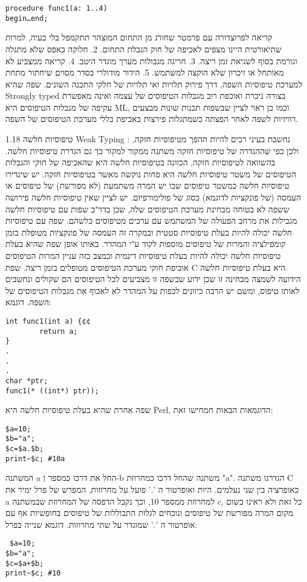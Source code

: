 \begin{טבלא}[!htbp]
\begin{verbatim}
procedure func1(a: 1..4)
begin…end;
\end{verbatim}

      קריאה לפרוצדורה עם פרמטר שחורג מן התחום המוצהר תתקמפל בלי בעיה, למרות שתיאורטית היינו מצפים לאכיפה של חוק הגבלת התחום.
      2. חלוקה באפס שלא מתגלה וגורמת בסוף לשגיאת זמן ריצה.
      3. חריגה מגבולות מערך מוגדר היטב.
      4. קריאה ממצביע לא מאותחל או זיכרון שלא הוקצה למשתמש.
      5. הידור מודולרי בסדר מסוים שיחתור מתחת למערכת טיפוסיות השפה, דרך פירוק תלויות ואי תלויות של חלקי התכנה השונים.
      שפה שהיא Strongly typed בצורה ניכרת ואוכפת רוב מגבלות הטיפוסים של עצמה ואינה מאפשרת עקיפה של מגבלות הטיפוסים היא ML, וכמו כן ראוי לציין שבשפות תכנות שונות מבצעים רוויזיות לשפה לאחר הפצתה כשמתגלות פירצות באכיפת כללי מערכת הטיפוסים של השפה.

      1.18 טיפוסיות חלשה Weak Typing :
      נחשבת בעיני רבים להיות ההפך מטיפוסיות חזקה, ולכן כפי שההגדרה של טיפוסיות חזקה משתנה ממקור למקור כך גם הגדרת טיפוסיות חלשה.
      בהשוואה לטיפוסיות חזקה, הכוונה בטיפוסיות חלשה היא שהאכיפה של חוקי והגבלות הטיפוסים של משטר טיפוסיות חלשה היא פחות נוקשה מאשר בטיפוסיות חזקה.
      יש שיגדירו טיפוסיות חלשה כמשטר טיפוסים שבו יש המרה משתמעת (לא מפורשת) של טיפוסים או העמסה (של פונקציות לדוגמא) כסוג של פולימורפיזם. יש לציין שאין טיפוסיות חלשה פירושה ששפה לא בטוחה מבחינת מערכת הטיפוסים שלה, שכן בדר"כ שפות עם טיפוסיות חלשה מגבילות את מרחב הפעולה של המשתמש עם ערכים מטיפוסים כלשהם. שפה עם טיפוסיות חלשה יכולה להיות בעלת טיפוסיות סטטית ובמקרה זה העמסה של פונקציות מטופלת בזמן קומפילציה והמרות של טיפוסים מוספות לקוד ע"י המהדר.
      באותו אופן שפה שהיא בעלת טיפוסיות חלשה יכולה להיות בעלת טיפוסיות דינמית ובמצב כזה עניין המרות הטיפוסים אוכיפת חוקי מערכת הטיפוסים מטופלים בזמן ריצה.
      שפת C היא בעלת טיפוסיות חלשה הידועה לשמצה מבחינה זו שכן ידוע שבשפה זו מצביעים לכל הטיפוסים הם שקולים ונחשבים לאותו טיפוס, ומשם יש הרבה כיוונים לכפות על המהדר לא לאכוף את מגבלות הטיפוסים של השפה. דוגמא:

\begin{verbatim}
int func1(int a) {¢¢
        return a;
}
.
.
.
char *ptr;
func1(* ((int*) ptr));
\end{verbatim}

      שפה אחרת שהיא בעלת טיפוסיות חלשה היא Perl, הדוגמאות הבאות חמחישו זאת:
\begin{verbatim}
$a=10;
$b="a";
$c=$a.$b;
print~$c; #10a
\end{verbatim}

      המשתנה a החל את דרכו כמספר וְ-b משתנה שהחל דרכו כמחרוזת "a". הגדרנו משתנה C כאופרציה בין שני נעלמים. היות ואופרטור ה '.' פועל על מחרוזות, המפרש של פרל ימיר את a למחרוזת ממספר 10, וכך נקבל הדפסה של המחרוזת שבמשתנה c, כל זאת ולא ראינו בשום מקום המרה מפורשת של טיפוסים ונוכחים לגלות התבוללות של טיפוסים בחופשיות אף עם אופרטור ה '.' שמוגדר על שתי מחרוזות.
      דוגמא שנייה בפרל:
\begin{verbatim}
 $a=10;
$b="a";
$c=$a+$b;
print~$c; #10
\end{verbatim}


\end{טבלא}
